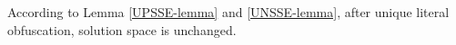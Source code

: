 \documentclass[conference,compsocconf]{IEEEtran}
\begin{document}
% 

According to Lemma \ref{UPSSE-lemma} and \ref{UNSSE-lemma},
after unique literal obfuscation, solution space is unchanged.
\end{document}
